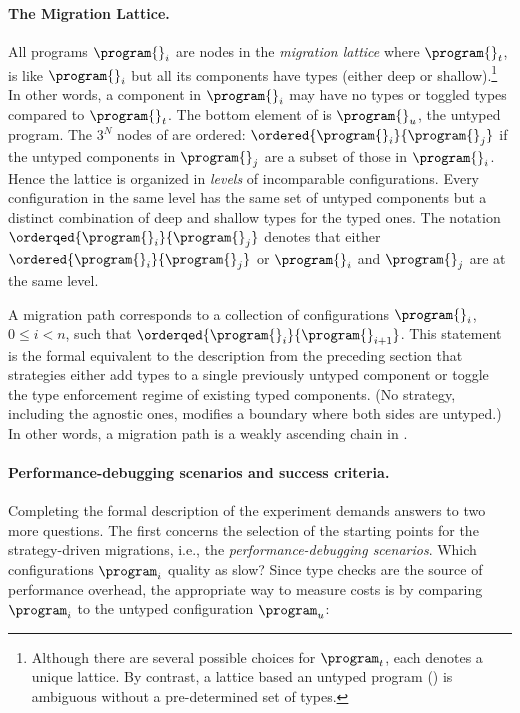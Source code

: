 \paragraph{The Migration Lattice.}  All programs $\program{}_i$ are nodes in the
\emph{migration lattice}  where ${\program{}_t}$, is like
${\program{}_i}$ but all its components have types (either deep or
shallow).\footnote{Although there are several possible choices for
$\program_t$, each denotes a unique lattice. By contrast, a lattice
based an untyped program () is ambiguous without a
pre-determined set of types.}
In other words, a component in ${\program{}_i}$ may have no types 
or toggled types compared to ${\program{}_t}$.
The bottom element of  is ${\program{}_u}$, the untyped
program.
The $3^N$ nodes of  are ordered:
$\ordered{\program{}_i}{\program{}_j}$ if
the untyped components in ${\program{}_j}$ are a subset
of those in ${\program{}_i}$.
Hence the lattice is organized in \emph{levels} of incomparable
configurations.
Every configuration in the same level has the same set of untyped components
but a distinct combination of deep and shallow types for the typed ones.
The notation $\orderqed{\program{}_i}{\program{}_j}$ denotes that either
$\ordered{\program{}_i}{\program{}_j}$ or $\program{}_i$ and $\program{}_j$
are at the same level.

A migration path corresponds to a collection of configurations $\program{}_i$,
$0 \leq i < n$, such that $\orderqed{\program{}_i}{\program{}_{i+1}}$.
This statement is the formal equivalent to the
description from the preceding section that strategies either add types to a
single previously untyped component or toggle the type enforcement regime of existing
typed components.
(No strategy, including the agnostic ones, modifies a boundary where both sides
are untyped.)
In other words, a migration path is a weakly ascending chain in
.


\paragraph{Performance-debugging scenarios and success criteria.} Completing the
formal description of the experiment demands answers to two more questions.
The first concerns the selection of the starting points for the strategy-driven
migrations, i.e., the \emph{performance-debugging scenarios}.
Which configurations $\program_i$ quality as slow?
Since type checks are the source of performance overhead, the appropriate
way to measure costs is by comparing $\program_i$ to the untyped configuration
$\program_u$:

